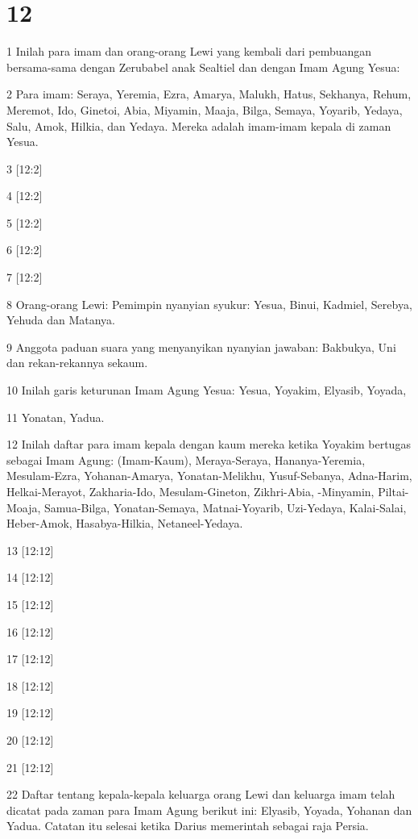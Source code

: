 \chapter{12}

\par 1 Inilah para imam dan orang-orang Lewi yang kembali dari pembuangan bersama-sama dengan Zerubabel anak Sealtiel dan dengan Imam Agung Yesua:
\par 2 Para imam: Seraya, Yeremia, Ezra, Amarya, Malukh, Hatus, Sekhanya, Rehum, Meremot, Ido, Ginetoi, Abia, Miyamin, Maaja, Bilga, Semaya, Yoyarib, Yedaya, Salu, Amok, Hilkia, dan Yedaya. Mereka adalah imam-imam kepala di zaman Yesua.
\par 3 [12:2]
\par 4 [12:2]
\par 5 [12:2]
\par 6 [12:2]
\par 7 [12:2]
\par 8 Orang-orang Lewi: Pemimpin nyanyian syukur: Yesua, Binui, Kadmiel, Serebya, Yehuda dan Matanya.
\par 9 Anggota paduan suara yang menyanyikan nyanyian jawaban: Bakbukya, Uni dan rekan-rekannya sekaum.
\par 10 Inilah garis keturunan Imam Agung Yesua: Yesua, Yoyakim, Elyasib, Yoyada,
\par 11 Yonatan, Yadua.
\par 12 Inilah daftar para imam kepala dengan kaum mereka ketika Yoyakim bertugas sebagai Imam Agung: (Imam-Kaum), Meraya-Seraya, Hananya-Yeremia, Mesulam-Ezra, Yohanan-Amarya, Yonatan-Melikhu, Yusuf-Sebanya, Adna-Harim, Helkai-Merayot, Zakharia-Ido, Mesulam-Gineton, Zikhri-Abia, -Minyamin, Piltai-Moaja, Samua-Bilga, Yonatan-Semaya, Matnai-Yoyarib, Uzi-Yedaya, Kalai-Salai, Heber-Amok, Hasabya-Hilkia, Netaneel-Yedaya.
\par 13 [12:12]
\par 14 [12:12]
\par 15 [12:12]
\par 16 [12:12]
\par 17 [12:12]
\par 18 [12:12]
\par 19 [12:12]
\par 20 [12:12]
\par 21 [12:12]
\par 22 Daftar tentang kepala-kepala keluarga orang Lewi dan keluarga imam telah dicatat pada zaman para Imam Agung berikut ini: Elyasib, Yoyada, Yohanan dan Yadua. Catatan itu selesai ketika Darius memerintah sebagai raja Persia.
